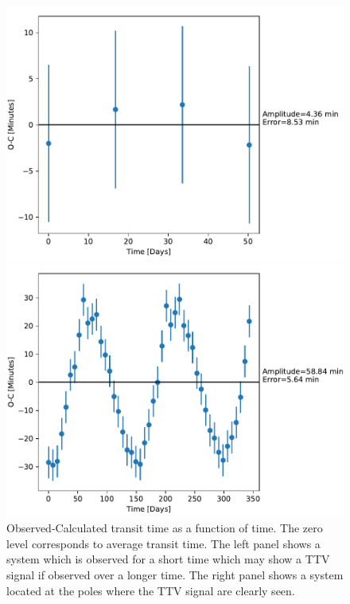 \documentclass[12pt]{report}
\begin{document}
\begin{figure}
\centering
\begin{minipage}{.5\textwidth}
  \centering
  \includegraphics[width=1\linewidth]{img/20_2.pdf}
 

\end{minipage}%
\begin{minipage}{.5\textwidth}
  \centering
  \includegraphics[width=1\linewidth]{img/247_1.pdf}
  

\end{minipage}
\caption{Observed-Calculated transit time as a function of time. The zero level corresponds to average transit time. The left panel shows a system which is observed for a short time which may show a TTV signal if observed over a longer time. The right panel shows a system located at the poles where the TTV signal are clearly seen.}
\label{fig:TTV1}
\end{figure}
\end{document}
